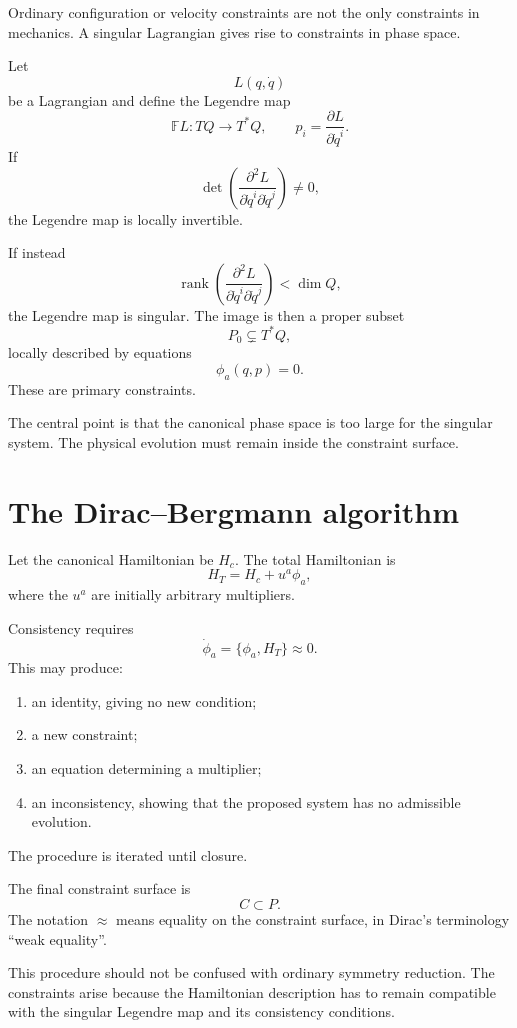 \documentclass[11pt,a4paper]{article}
\newcommand{\approxd}{\mathrel{\approx}}
\newcommand{\rank}{\operatorname{rank}}
\theoremstyle{definition}
\begin{document}
Ordinary configuration or velocity constraints are not the only constraints
in mechanics.  A singular Lagrangian gives rise to constraints in phase space.

Let
\[
        L(q,\dot q)
\]
be a Lagrangian and define the Legendre map
\[
        \mathbb FL:TQ\longrightarrow T^*Q,
        \qquad
        p_i=\frac{\partial L}{\partial\dot q^i}.
\]
If
\[
        \det\left(
        \frac{\partial^2L}{\partial\dot q^i\partial\dot q^j}
        \right)\neq0,
\]
the Legendre map is locally invertible.

If instead
\[
        \rank\left(
        \frac{\partial^2L}{\partial\dot q^i\partial\dot q^j}
        \right)<\dim Q,
\]
the Legendre map is singular.  The image is then a proper subset
\[
        P_0\subsetneq T^*Q,
\]
locally described by equations
\[
        \phi_a(q,p)=0.
\]
These are primary constraints.

The central point is that the canonical phase space is too large for the
singular system.  The physical evolution must remain inside the constraint
surface.

\section{The Dirac--Bergmann algorithm}

Let the canonical Hamiltonian be $H_c$.  The total Hamiltonian is
\[
        H_T=H_c+u^a\phi_a,
\]
where the $u^a$ are initially arbitrary multipliers.

Consistency requires
\[
        \dot\phi_a
        =
        \{\phi_a,H_T\}
        \approxd0.
\]
This may produce:

\begin{enumerate}
\item an identity, giving no new condition;
\item a new constraint;
\item an equation determining a multiplier;
\item an inconsistency, showing that the proposed system has no admissible
      evolution.
\end{enumerate}

The procedure is iterated until closure.

The final constraint surface is
\[
        C\subset P.
\]
The notation $\approxd$ means equality on the constraint surface, in Dirac's
terminology ``weak equality''.

This procedure should not be confused with ordinary symmetry reduction.
The constraints arise because the Hamiltonian description has to remain
compatible with the singular Legendre map and its consistency conditions.
\end{document}
